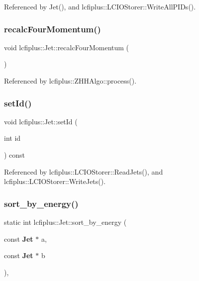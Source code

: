 Referenced by Jet(), and lcfiplus\+::\+L\+C\+I\+O\+Storer\+::\+Write\+All\+P\+I\+Ds().

\mbox{\label{classlcfiplus_1_1Jet_a38baabc1a6078719c15eba82f0ed16d9}} 
\subsubsection{recalc\+Four\+Momentum()}
{\footnotesize\ttfamily void lcfiplus\+::\+Jet\+::recalc\+Four\+Momentum (\begin{DoxyParamCaption}{ }\end{DoxyParamCaption})\hspace{0.3cm}{\ttfamily [inline]}}



Referenced by lcfiplus\+::\+Z\+H\+H\+Algo\+::process().

\mbox{\label{classlcfiplus_1_1Jet_a7858c4792c4162023066ba6ddfdc2851}} 
\subsubsection{set\+Id()}
{\footnotesize\ttfamily void lcfiplus\+::\+Jet\+::set\+Id (\begin{DoxyParamCaption}\item[{int}]{id }\end{DoxyParamCaption}) const\hspace{0.3cm}{\ttfamily [inline]}}



Referenced by lcfiplus\+::\+L\+C\+I\+O\+Storer\+::\+Read\+Jets(), and lcfiplus\+::\+L\+C\+I\+O\+Storer\+::\+Write\+Jets().

\mbox{\label{classlcfiplus_1_1Jet_abbcdeb3cc9261f71d35cf9c0cbea4cf2}} 
\subsubsection{sort\+\_\+by\+\_\+energy()}
{\footnotesize\ttfamily static int lcfiplus\+::\+Jet\+::sort\+\_\+by\+\_\+energy (\begin{DoxyParamCaption}\item[{const \textbf{ Jet} $\ast$}]{a,  }\item[{const \textbf{ Jet} $\ast$}]{b }\end{DoxyParamCaption})\hspace{0.3cm}{\ttfamily [inline]}, {\ttfamily [static]}}



